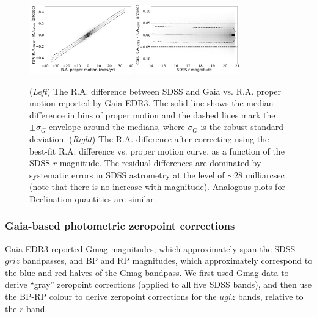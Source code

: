 \documentclass[fleqn,usenatbib]{mnras}
\begin{document}
\begin{figure}
\centering \includegraphics[width=0.4\textwidth, keepaspectratio]{figures/astroVSpm_RA_pm.png}
\centering \includegraphics[width=0.4\textwidth, keepaspectratio]{figures/astroVSpm_RA_r.png}

\caption{({\it Left}) The R.A. difference between SDSS and Gaia 
vs. R.A. proper motion reported by Gaia EDR3. The solid line shows the median difference in bins 
of proper motion and the dashed lines mark the $\pm \sigma_G$ envelope around the medians,
where $\sigma_G$ is the robust standard deviation. ({\it Right}) The R.A. difference 
after correcting using the best-fit R.A. difference vs. 
proper motion curve, as a function of the SDSS $r$ magnitude. The residual differences are dominated 
by systematic errors in SDSS astrometry at the level of $\sim28$ milliarcsec (note that there is no increase with 
magnitude). Analogous plots for Declination quantities are similar. 
\label{fig:GaiaRApm}}
\end{figure}


\subsubsection{Gaia-based photometric zeropoint corrections  \label{sec:GaiaCorr2}}

Gaia EDR3 reported Gmag magnitudes, which approximately span the SDSS $griz$ bandpasses, 
and BP and RP magnitudes, which approximately correspond to the blue and red halves of the 
Gmag bandpass. We first used Gmag data to derive ``gray'' zeropoint corrections (applied to
all five SDSS bands), and then use the BP-RP colour to derive zeropoint corrections for the 
$ugiz$ bands, relative to the $r$ band. 
\end{document}

